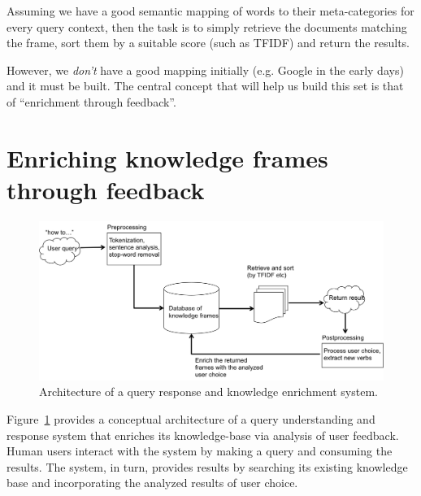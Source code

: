 \documentclass[10pt,letterpaper]{article}
\begin{document}
Assuming we have a good semantic mapping of words to their meta-categories for every query context, then the task is to simply retrieve the documents matching the frame, sort them by a suitable score (such as TFIDF) and return the results.

However, we {\em don't} have a good mapping initially (e.g. Google in the early days) and it must be built. The central concept that will help us build this set is that of ``enrichment through feedback''. 

\section{Enriching knowledge frames through feedback}
\begin{figure}[!tbp]
\includegraphics[width=6in]{./figures/arch.png}
\caption{Architecture of a query response and knowledge enrichment system. \label{fig1}}
\end{figure}
Figure~\ref{fig1} provides a conceptual architecture of a query understanding and response system that enriches its knowledge-base via analysis of user feedback. Human users interact with the system by making a query and consuming the results. The system, in turn, provides results by searching its existing knowledge base and incorporating the analyzed results of user choice.
\end{document}
